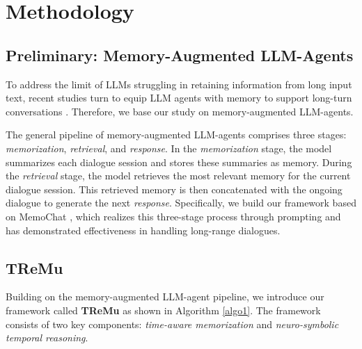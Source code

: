 





\section{Methodology}

\subsection{Preliminary: Memory-Augmented LLM-Agents}
To address the limit of LLMs struggling in retaining information from long input text, recent studies turn to equip LLM agents with memory to support long-turn conversations \cite{lu2023memochat,packer2023memgpt,zhong2024memorybank}. Therefore, we base our study on memory-augmented LLM-agents.


The general pipeline of memory-augmented LLM-agents comprises three stages: \textit{memorization}, \textit{retrieval}, and \textit{response}. In the \textit{memorization} stage, the model summarizes each dialogue session and stores these summaries as memory. During the \textit{retrieval} stage, the model retrieves the most relevant memory for the current dialogue session. This retrieved memory is then concatenated with the ongoing dialogue to generate the next \textit{response}.
Specifically, we build our framework based on MemoChat \cite{lu2023memochat}, which realizes this three-stage process through prompting and has demonstrated effectiveness in handling long-range dialogues.

\subsection{TReMu}
Building on the memory-augmented LLM-agent pipeline, we introduce our framework called \textbf{TReMu} as shown in Algorithm \ref{algo1}. The framework consists of two key components: \textit{time-aware memorization} and \textit{neuro-symbolic temporal reasoning}.

